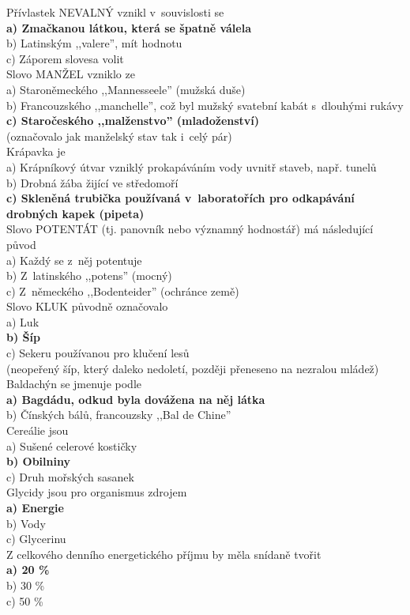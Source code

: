 \begin{multicols}{4}
\noindent
Přívlastek NEVALNÝ vznikl v~souvislosti se\\
\textbf{a) Zmačkanou látkou, která se špatně válela}\\
b) Latinským ,,valere'', mít hodnotu\\
c) Záporem slovesa volit\\

\noindent
Slovo MANŽEL vzniklo ze\\
a) Staroněmeckého ,,Mannesseele'' (mužská duše)\\
b) Francouzského ,,manchelle'', což byl mužský svatební kabát 
s~dlouhými rukávy\\
\textbf{c) Staročeského ,,malženstvo'' (mladoženství)}\\
(označovalo jak manželský stav tak i~celý pár)\\

\noindent
Krápavka je \\
a) Krápníkový útvar vzniklý prokapáváním vody uvnitř staveb, 
např. tunelů\\
b) Drobná žába žijící ve středomoří\\
\textbf{c) Skleněná trubička používaná v~laboratořích pro 
odkapávání drobných kapek (pipeta)}\\

\noindent
Slovo POTENTÁT (tj. panovník nebo významný hodnostář) má následující 
původ\\
a) Každý se z~něj potentuje\\
b) Z~latinského ,,potens'' (mocný)\\
c) Z~německého ,,Bodenteider'' (ochránce země)\\

\noindent
Slovo KLUK původně označovalo\\
a) Luk\\
\textbf{b) Šíp}\\
c) Sekeru používanou pro klučení lesů\\
(neopeřený šíp, který daleko nedoletí, později přeneseno na nezralou 
mládež)\\

\noindent
Baldachýn se jmenuje podle\\
\textbf{a) Bagdádu, odkud byla dovážena na něj látka}\\
b) Čínských bálů, francouzsky ,,Bal de Chine''\\

\noindent
Cereálie jsou\\
a) Sušené celerové kostičky\\
\textbf{b) Obilniny}\\
c) Druh mořských sasanek\\

\noindent
Glycidy jsou pro organismus zdrojem\\
\textbf{a) Energie}\\
b) Vody\\
c) Glycerinu\\

\noindent
Z celkového denního energetického příjmu by měla snídaně tvořit\\
\textbf{a) 20 \%}\\
b) 30 \%\\
c) 50 \%\\

\end{multicols}
\clearpage

